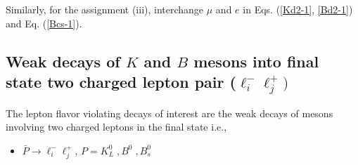 \documentclass{ws-ijmpa}
\begin{document}
Similarly, for the assignment (iii), interchange $\mu$ and $e$ in Eqs. (\ref{Kd2-1}, \ref{Bd2-1}) and Eq. (\ref{Bcs-1}).
\subsection{Weak decays of $K$ and $B$ mesons into final state two charged lepton pair ($\ell^{-}_i\ell^{+}_j)$}

The lepton flavor violating decays of interest are the weak decays of mesons involving two charged leptons in the final state i.e., 
\begin{itemize}
\item $\bar{P}\to \ell^{-}_i\ell^{+}_j$\;, \quad\quad\quad\quad\quad $P = K_{L}^{0}\;,  B^{0}\;,  B_{s}^{0}$
\end{itemize}
\end{document}
